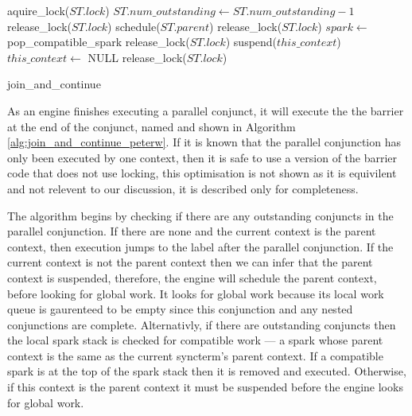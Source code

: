 \begin{algorithm}
\begin{algorithmic}
  \State aquire\_lock($ST.lock$)
  \State $ST.num\_outstanding \gets ST.num\_outstanding - 1$
      \State release\_lock($ST.lock$)
    \Else
      \State schedule($ST.parent$)
      \State release\_lock($ST.lock$)
    \EndIf
  \Else
    \State $spark \gets$ pop\_compatible\_spark
       \State release\_lock($ST.lock$)
    \Else
         \State suspend($this\_context$)
         \State $this\_context \gets$ NULL
      \EndIf
      \State release\_lock($ST.lock$)
    \EndIf
  \EndIf
\EndProcedure
\end{algorithmic}
\caption{join\_and\_continue}
\label{alg:join_and_continue_peterw}
\end{algorithm}

As an engine finishes executing a parallel conjunct,
it will execute the the barrier at the end of the conjunct,
named \joinandcontinue and shown in 
Algorithm \ref{alg:join_and_continue_peterw}.
If it is known that the parallel conjunction has only been executed by
one context,
then it is safe to use a version of the barrier code that does not use
locking,
this optimisation is not shown as it is equivilent and not relevent to
our discussion,
it is described only for completeness.

The algorithm begins by checking if there are any outstanding conjuncts in
the parallel conjunction.
If there are none and the current context is the parent
context,
then execution jumps to the label after the parallel conjunction.
If the current context is not the parent context then
we can infer that the parent context is suspended,
therefore, 
the engine will schedule the parent context, before looking for global work.
It looks for global work because its local work queue is gaurenteed to be
empty since this conjunction and any nested conjunctions are complete.
Alternativly, if there are outstanding conjuncts then
the local spark stack is checked for compatible work ---
a spark whose parent context is the same as the current syncterm's parent
context.
If a compatible spark is at the top of the spark stack then it is removed
and executed.
Otherwise,
if this context is the parent context it must be suspended
before the engine looks for global work.

